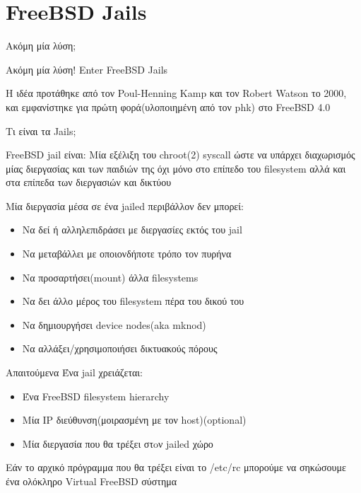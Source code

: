 \documentclass{beamer}
\begin{document}
\section{FreeBSD Jails}
    \begin{frame}{Ακόμη μία λύση;}

        \begin{block}{Ακόμη μία λύση!}
            Enter FreeBSD Jails
        \end{block}

        Η ιδέα προτάθηκε από τον Poul-Henning Kamp και τον Robert Watson το 2000, και εμφανίστηκε για πρώτη φορά(υλοποιημένη από τον phk) στο FreeBSD 4.0

    \end{frame}

    \begin{frame}{Τι είναι τα Jails;}
        \begin{block}{FreeBSD jail είναι:}
            Μία εξέλιξη του chroot(2) syscall ώστε να υπάρχει διαχωρισμός μίας διεργασίας και των παιδιών της όχι μόνο στο επίπεδο του filesystem αλλά και στα επίπεδα των διεργασιών και δικτύου
        \end{block}
        Μία διεργασία μέσα σε ένα jailed περιβάλλον δεν μπορεί:
        \begin{itemize}
            \item Να δεί ή αλληλεπιδράσει με διεργασίες εκτός του jail
            \item Να μεταβάλλει με οποιονδήποτε τρόπο τον πυρήνα
            \item Να προσαρτήσει(mount) άλλα filesystems
            \item Να δει άλλο μέρος του filesystem πέρα του δικού του
            \item Να δημιουργήσει device nodes(aka mknod)
            \item Nα αλλάξει/χρησιμοποιήσει δικτυακούς πόρους
        \end{itemize}

    \end{frame}

    \begin{frame}{Απαιτούμενα}
        Ένα jail χρειάζεται:
        \begin{itemize}
            \item Ένα FreeBSD filesystem hierarchy
            \item Μία IP διεύθυνση(μοιρασμένη με τον host)(optional)
            \item Μία διεργασία που θα τρέξει στoν jailed χώρο
        \end{itemize}
        Εάν το αρχικό πρόγραμμα που θα τρέξει είναι το /etc/rc μπορούμε να σηκώσουμε ένα ολόκληρο Virtual FreeBSD σύστημα

    \end{frame}
\end{document}
